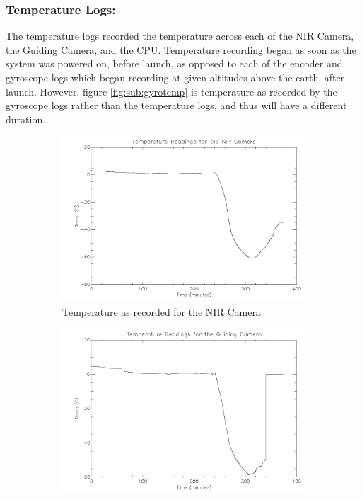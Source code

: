 {\subsubsection*{Temperature Logs:}
The temperature logs recorded the temperature across each of the NIR Camera, the Guiding Camera, and the CPU. Temperature recording began as soon as the system was powered on, before launch, as opposed to each of the encoder and gyroscope logs which began recording at given altitudes above the earth, after launch. However, figure \ref{fig:sub:gyrotemp} is temperature as recorded by the gyroscope logs rather than the temperature logs, and thus will have a different duration. 

\begin{figure}[htbp]
\captionsetup[subfigure]{justification=centering}
\captionsetup{justification=centering}
    \centering
    \begin{subfigure}{0.45\textwidth}
		\includegraphics[width=1\linewidth]{appendix/img/campaign_results/tempnir.png}
		\caption{Temperature as recorded for the NIR Camera}
		\label{fig:sub:NIRtemp}
	\end{subfigure}
	\begin{subfigure}{0.45\textwidth}
		\includegraphics[width=1\linewidth]{appendix/img/campaign_results/tempgc.png}

\end{subfigure}
\end{figure}}
